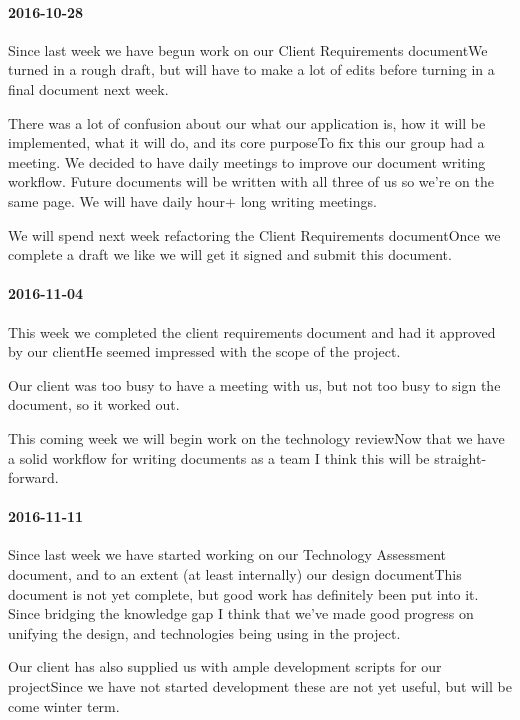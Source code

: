 \paragraph{2016-10-28}

Since last week we have begun work on our Client Requirements documentWe turned in a rough draft, but will have to make a lot of edits before turning in a final document next week.

There was a lot of confusion about our what our application is, how it will be implemented, what it will do, and its core purposeTo fix this our group had a meeting.
We decided to have daily meetings to improve our document writing workflow.
Future documents will be written with all three of us so we're on the same page.
We will have daily hour+ long writing meetings.

We will spend next week refactoring the Client Requirements documentOnce we complete a draft we like we will get it signed and submit this document.

\paragraph{2016-11-04}

This week we completed the client requirements document and had it approved by our clientHe seemed impressed with the scope of the project.

Our client was too busy to have a meeting with us, but not too busy to sign the document, so it worked out.

This coming week we will begin work on the technology reviewNow that we have a solid workflow for writing documents as a team I think this will be straight-forward.

\paragraph{2016-11-11}

Since last week we have started working on our Technology Assessment document, and to an extent (at least internally) our design documentThis document is not yet complete, but good work has definitely been put into it.
Since bridging the knowledge gap I think that we've made good progress on unifying the design, and technologies being using in the project.

Our client has also supplied us with ample development scripts for our projectSince we have not started development these are not yet useful, but will be come winter term.

